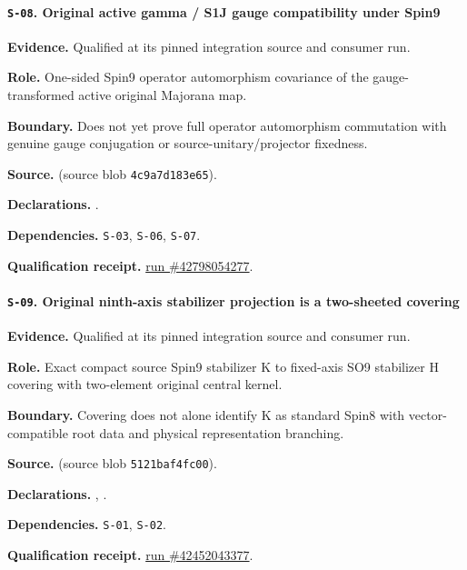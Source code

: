 \paragraph{\texttt{S-08}. Original active gamma / S1J gauge compatibility under Spin9}
\noindent\textbf{Evidence.} Qualified at its pinned integration source and consumer run.
\par\noindent\textbf{Role.} One-sided Spin9 operator automorphism covariance of the gauge-transformed active original Majorana map.
\par\noindent\textbf{Boundary.} Does not yet prove full operator automorphism commutation with genuine gauge conjugation or source-unitary/projector fixedness.
\par\noindent\textbf{Source.}  (source blob \texttt{4c9a7d183e65}).
\par\noindent\textbf{Declarations.} .
\par\noindent\textbf{Dependencies.} \texttt{S-03}, \texttt{S-06}, \texttt{S-07}.
\par\noindent\textbf{Qualification receipt.} \href{https://github.com/etblink/math/actions/runs/42798054277}{run \#42798054277}.
\medskip

\paragraph{\texttt{S-09}. Original ninth-axis stabilizer projection is a two-sheeted covering}
\noindent\textbf{Evidence.} Qualified at its pinned integration source and consumer run.
\par\noindent\textbf{Role.} Exact compact source Spin9 stabilizer K to fixed-axis SO9 stabilizer H covering with two-element original central kernel.
\par\noindent\textbf{Boundary.} Covering does not alone identify K as standard Spin8 with vector-compatible root data and physical representation branching.
\par\noindent\textbf{Source.}  (source blob \texttt{5121baf4fc00}).
\par\noindent\textbf{Declarations.} , .
\par\noindent\textbf{Dependencies.} \texttt{S-01}, \texttt{S-02}.
\par\noindent\textbf{Qualification receipt.} \href{https://github.com/etblink/math/actions/runs/42452043377}{run \#42452043377}.
\medskip

